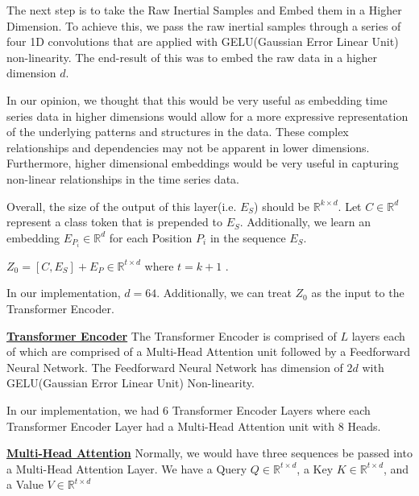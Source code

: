 \documentclass[conference]{IEEEtran}
\begin{document}
The next step is to take the Raw Inertial Samples and Embed them in a Higher Dimension. To achieve this, we pass the raw inertial samples through a series of four 1D convolutions that are applied with GELU(Gaussian Error Linear Unit) non-linearity. The end-result of this was to embed the raw data in a higher dimension $d$. \newline 


In our opinion, we thought that this would be very useful as embedding time series data in higher dimensions would allow for a more expressive representation of the underlying patterns and structures in the data. These complex relationships and dependencies may not be apparent in lower dimensions. Furthermore, higher dimensional embeddings would be very useful in capturing non-linear relationships in the time series data. \newline 

Overall, the size of the output of this layer(i.e. $E_S$) should be $\mathbb{R}^{k \times d}$. Let $C \in \mathbb{R}^{d}$ represent a class token that is prepended to $E_S$. Additionally, we learn an embedding $E_{P_i} \in \mathbb{R}^d$ for each Position $P_i$ in the sequence $E_S$. 


$Z_0 = [C, E_S] + E_P \in \mathbb{R}^{t \times d}$
where $t = k + 1$ .  

In our implementation, $d = 64$. Additionally, we can treat $Z_0$ as the input to the Transformer Encoder. \newline 

\textbf{\underline{Transformer Encoder}} \newline 
The Transformer Encoder is comprised of $L$ layers each of which are comprised of a Multi-Head Attention unit followed by a Feedforward Neural Network. The Feedforward Neural Network has dimension of $2d$ with GELU(Gaussian Error Linear Unit) Non-linearity. \newline 

In our implementation, we had 6 Transformer Encoder Layers where each Transformer Encoder Layer had a Multi-Head Attention unit with 8 Heads. \newline 

\textbf{\underline{Multi-Head Attention}} \newline
Normally, we would have three sequences be passed into a Multi-Head Attention Layer. We have a Query $Q \in \mathbb{R}^{t \times d}$, a Key $K \in \mathbb{R}^{t \times d}$, and a Value $V \in \mathbb{R}^{t \times d}$ \newline 
\end{document}

